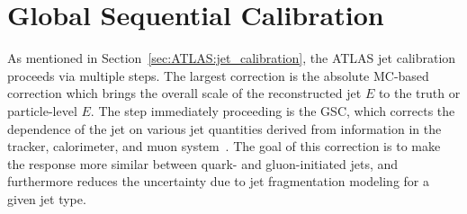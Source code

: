 \section{Global Sequential Calibration}
\label{sec:GenNI:jetreco}
As mentioned in Section~\ref{sec:ATLAS:jet_calibration}, the ATLAS jet calibration proceeds via multiple steps.
The largest correction is the absolute MC-based correction which brings the overall scale of the reconstructed jet $E$ to the truth or particle-level $E$.
The step immediately proceeding is the GSC, which corrects the dependence of the jet \pt{} on various jet quantities derived from information in the tracker, calorimeter, and muon system~\cite{PERF-2016-04}.
The goal of this correction is to make the response more similar between quark- and gluon-initiated jets, and furthermore reduces the uncertainty due to jet fragmentation modeling for a given jet type.

